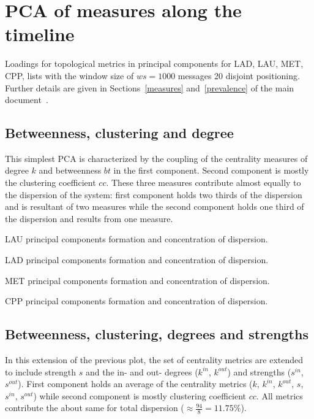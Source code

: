 \documentclass[%
 aip,
 jmp,%
 amsmath,amssymb,
 reprint,%
 floatfix,
]{revtex4-1}
\begin{document}
\FloatBarrier
\section{PCA of measures along the timeline}\label{si:pcat}
Loadings for topological metrics in principal components for LAD, LAU, MET, CPP, lists with the window size of $ws=1000$ messages 20 disjoint positioning.
Further details are given in Sections~\ref*{measures} and~\ref*{prevalence} of the main document~\cite{tpaper}.



\subsection{Betweenness, clustering and degree}
This simplest PCA is characterized by the coupling of
the centrality measures of degree $k$ and betweenness $bt$
in the first component.
Second component is mostly the clustering coefficient $cc$.
These three measures contribute almost equally to the dispersion of the system: first component holds two thirds of the dispersion and is resultant of two measures while the second component holds one third of the dispersion and results from one measure.

\begin{table}[!h]
	\caption{LAU principal components formation and concentration of dispersion.}
	\footnotesize
	
\label{tab:pcain}
\end{table}

\begin{table}[!h]
	\caption{LAD principal components formation and concentration of dispersion.}
	\footnotesize
	
\label{tab:pcain}
\end{table}

\begin{table}[!h]
	\caption{MET principal components formation and concentration of dispersion.}
	\footnotesize
	
\label{tab:pcain}
\end{table}

\begin{table}[!h]
	\caption{CPP principal components formation and concentration of dispersion.}
	\footnotesize
	
\label{tab:pcain}
\end{table}

\FloatBarrier
\subsection{Betweenness, clustering, degrees and strengths}
In this extension of the previous plot, the set of centrality metrics are extended to include strength $s$ and the in- and out- degrees ($k^{in}$, $k^{out}$) and strengths ($s^{in}$, $s^{out}$).
First component holds an average of the centrality metrics ($k$, $k^{in}$, $k^{out}$, $s$, $s^{in}$, $s^{out}$) while
second component is mostly clustering coefficient $cc$.
All metrics contribute the about same for total dispersion
($\approx \frac{94}{8}=11.75\%$).
\end{document}
